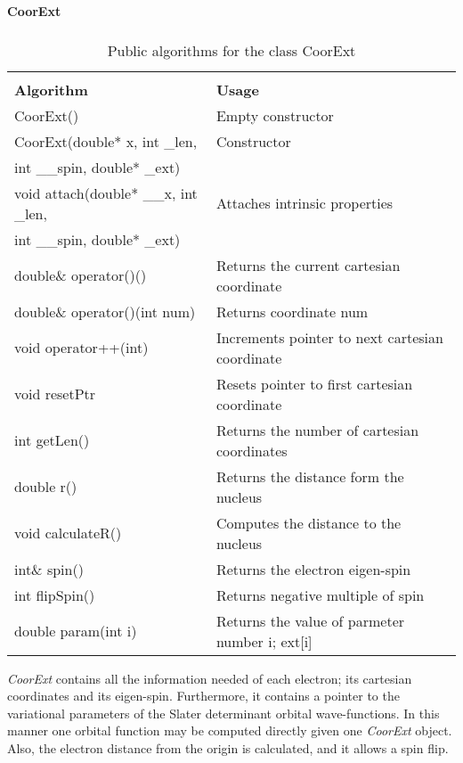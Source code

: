 \begin{table}[hbtp]
\begin{center} {\large \bf CoorExt} \\ 
$\phantom{a}$ \\
\begin{tabular}{ll}
\hline\\ 
{\bf Algorithm}                   & {\bf Usage} \\
CoorExt()                         & Empty constructor\\
CoorExt(double* x, int \_len,     & Constructor\\
\phantom{a} int \_\_spin, double* \_ext)& \\
void attach(double* \_\_x, int \_len,& Attaches intrinsic properties\\
\phantom{a} int \_\_spin, double* \_ext)& \\
double\& operator()()             & Returns the current cartesian coordinate\\
double\& operator()(int num)      & Returns coordinate num\\
void operator++(int)              & Increments pointer to next cartesian coordinate\\
void resetPtr                     & Resets pointer to first cartesian coordinate\\
int getLen()                      & Returns the number of cartesian coordinates\\
double r()                        & Returns the distance form the nucleus\\
void calculateR()                 & Computes the distance to the nucleus\\
int\& spin()                      & Returns the electron eigen-spin\\
int flipSpin()                    & Returns negative multiple of spin\\
double param(int i)               & Returns the value of parmeter number i; ext[i]\\
\hline
\end{tabular} 
 \end{center}
  \caption{Public algorithms for the class CoorExt}
\label{CoorExt}
\end{table}

\emph{CoorExt} contains all the information needed of each electron;
its cartesian coordinates and its eigen-spin. Furthermore, it contains
a pointer to the variational parameters of the Slater determinant
orbital wave-functions. In this manner one orbital function may be
computed directly given one \emph{CoorExt} object.
Also, the electron distance from the origin is calculated, and it
allows a spin flip.



